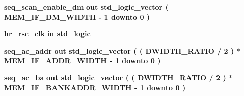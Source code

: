 \begin{DoxyCompactItemize}
\item 
{\bf seq\+\_\+scan\+\_\+enable\+\_\+dm}  {\bfseries {\bfseries \textcolor{keywordflow}{out}\textcolor{vhdlchar}{ }}} {\bfseries \textcolor{comment}{std\+\_\+logic\+\_\+vector}\textcolor{vhdlchar}{ }\textcolor{vhdlchar}{(}\textcolor{vhdlchar}{ }\textcolor{vhdlchar}{ }\textcolor{vhdlchar}{ }\textcolor{vhdlchar}{ }{\bfseries {\bf M\+E\+M\+\_\+\+I\+F\+\_\+\+D\+M\+\_\+\+W\+I\+D\+TH}} \textcolor{vhdlchar}{-\/}\textcolor{vhdlchar}{ } \textcolor{vhdldigit}{1} \textcolor{vhdlchar}{ }\textcolor{keywordflow}{downto}\textcolor{vhdlchar}{ }\textcolor{vhdlchar}{ } \textcolor{vhdldigit}{0} \textcolor{vhdlchar}{ }\textcolor{vhdlchar}{)}\textcolor{vhdlchar}{ }} 
\item 
{\bf hr\+\_\+rsc\+\_\+clk}  {\bfseries {\bfseries \textcolor{keywordflow}{in}\textcolor{vhdlchar}{ }}} {\bfseries \textcolor{comment}{std\+\_\+logic}\textcolor{vhdlchar}{ }} 
\item 
{\bf seq\+\_\+ac\+\_\+addr}  {\bfseries {\bfseries \textcolor{keywordflow}{out}\textcolor{vhdlchar}{ }}} {\bfseries \textcolor{comment}{std\+\_\+logic\+\_\+vector}\textcolor{vhdlchar}{ }\textcolor{vhdlchar}{(}\textcolor{vhdlchar}{ }\textcolor{vhdlchar}{(}\textcolor{vhdlchar}{ }\textcolor{vhdlchar}{ }\textcolor{vhdlchar}{ }\textcolor{vhdlchar}{ }{\bfseries {\bf D\+W\+I\+D\+T\+H\+\_\+\+R\+A\+T\+IO}} \textcolor{vhdlchar}{/}\textcolor{vhdlchar}{ } \textcolor{vhdldigit}{2} \textcolor{vhdlchar}{ }\textcolor{vhdlchar}{)}\textcolor{vhdlchar}{ }\textcolor{vhdlchar}{$\ast$}\textcolor{vhdlchar}{ }\textcolor{vhdlchar}{ }\textcolor{vhdlchar}{ }{\bfseries {\bf M\+E\+M\+\_\+\+I\+F\+\_\+\+A\+D\+D\+R\+\_\+\+W\+I\+D\+TH}} \textcolor{vhdlchar}{-\/}\textcolor{vhdlchar}{ } \textcolor{vhdldigit}{1} \textcolor{vhdlchar}{ }\textcolor{keywordflow}{downto}\textcolor{vhdlchar}{ }\textcolor{vhdlchar}{ } \textcolor{vhdldigit}{0} \textcolor{vhdlchar}{ }\textcolor{vhdlchar}{)}\textcolor{vhdlchar}{ }} 
\item 
{\bf seq\+\_\+ac\+\_\+ba}  {\bfseries {\bfseries \textcolor{keywordflow}{out}\textcolor{vhdlchar}{ }}} {\bfseries \textcolor{comment}{std\+\_\+logic\+\_\+vector}\textcolor{vhdlchar}{ }\textcolor{vhdlchar}{(}\textcolor{vhdlchar}{ }\textcolor{vhdlchar}{(}\textcolor{vhdlchar}{ }\textcolor{vhdlchar}{ }\textcolor{vhdlchar}{ }\textcolor{vhdlchar}{ }{\bfseries {\bf D\+W\+I\+D\+T\+H\+\_\+\+R\+A\+T\+IO}} \textcolor{vhdlchar}{/}\textcolor{vhdlchar}{ } \textcolor{vhdldigit}{2} \textcolor{vhdlchar}{ }\textcolor{vhdlchar}{)}\textcolor{vhdlchar}{ }\textcolor{vhdlchar}{$\ast$}\textcolor{vhdlchar}{ }\textcolor{vhdlchar}{ }\textcolor{vhdlchar}{ }{\bfseries {\bf M\+E\+M\+\_\+\+I\+F\+\_\+\+B\+A\+N\+K\+A\+D\+D\+R\+\_\+\+W\+I\+D\+TH}} \textcolor{vhdlchar}{-\/}\textcolor{vhdlchar}{ } \textcolor{vhdldigit}{1} \textcolor{vhdlchar}{ }\textcolor{keywordflow}{downto}\textcolor{vhdlchar}{ }\textcolor{vhdlchar}{ } \textcolor{vhdldigit}{0} \textcolor{vhdlchar}{ }\textcolor{vhdlchar}{)}\textcolor{vhdlchar}{ }} 

\end{DoxyCompactItemize}
